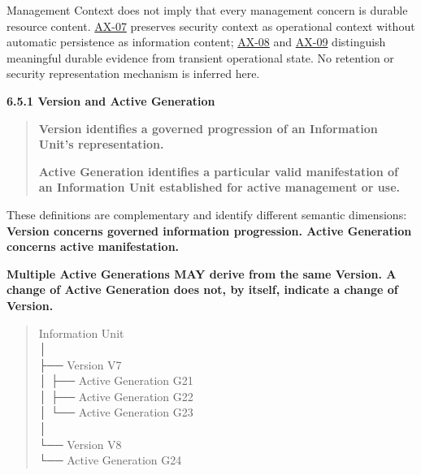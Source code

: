 Management Context does not imply that every management concern is durable
resource content. \hyperref[element:5de2ae2c3b794c2d9f3a14efd51d564f]{AX-07} preserves
security context as operational context without automatic persistence as
information content; \hyperref[element:21d6864657964ba5b03e3f6b5eb29cd5]{AX-08} and
\hyperref[element:9a5cb9e8876844e58e660f909f7df9fc]{AX-09} distinguish meaningful
durable evidence from transient operational state. No retention or security
representation mechanism is inferred here.



\par\medskip\textbf{6.5.1 Version and Active Generation}\par


\begin{quote}


\textbf{Version identifies a governed progression of an Information Unit's representation.}



\textbf{Active Generation identifies a particular valid manifestation of an Information Unit established for active management or use.}



\end{quote}


These definitions are complementary and identify different semantic dimensions:
\textbf{Version concerns governed information progression. Active Generation concerns
active manifestation.}



\textbf{Multiple Active Generations MAY derive from the same Version. A change of
Active Generation does not, by itself, indicate a change of Version.}



\begin{quote}\small\ttfamily
Information Unit\\
      │\\
      ├── Version V7\\
      │      ├── Active Generation G21\\
      │      ├── Active Generation G22\\
      │      └── Active Generation G23\\
      │\\
      └── Version V8\\
             └── Active Generation G24\\

\end{quote}


